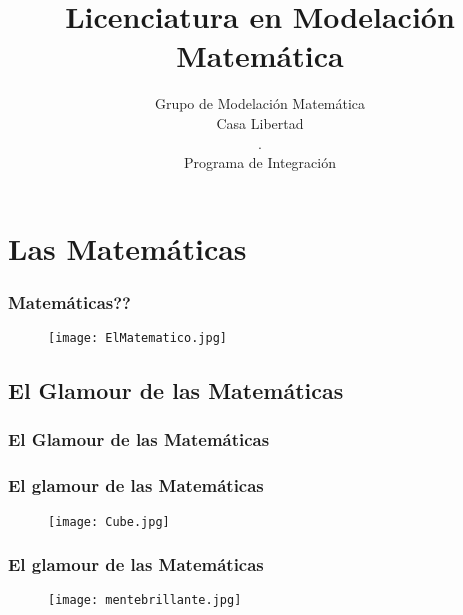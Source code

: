 \documentclass[xcolor=dvipsnames]{beamer}
\title{Licenciatura en Modelaci\'on Matem\'atica}
\author{Grupo de Modelaci\'on Matem\'atica\\
\small{Casa Libertad}\\
.\\
{Programa de Integraci\'on }
}
\begin{document}
%
\begin{frame}
  \maketitle

\end{frame}


\section*{}
\small
\begin{frame}
\tableofcontents
\end{frame}
%


\section{Las Matem\'aticas}

\begin{frame}\frametitle{Matem\'aticas??}
\huge\textbf{
}
\pause
\begin{figure}[H]
\centering
\texttt{[image: ElMatematico.jpg]}
\end{figure}
\end{frame}



\subsection{El Glamour de las Matem\'aticas}


\begin{frame}\frametitle{El Glamour de las Matem\'aticas}
\huge\textbf{
}
\end{frame}

\begin{frame}\frametitle{El glamour de las Matem\'aticas}

\begin{figure}[H]
\centering
\texttt{[image: Cube.jpg]}
\end{figure}
\end{frame}


\begin{frame}\frametitle{El glamour de las Matem\'aticas}

\begin{figure}[H]
\centering
\texttt{[image: mentebrillante.jpg]}
\end{figure}
\end{frame}
\end{document}

